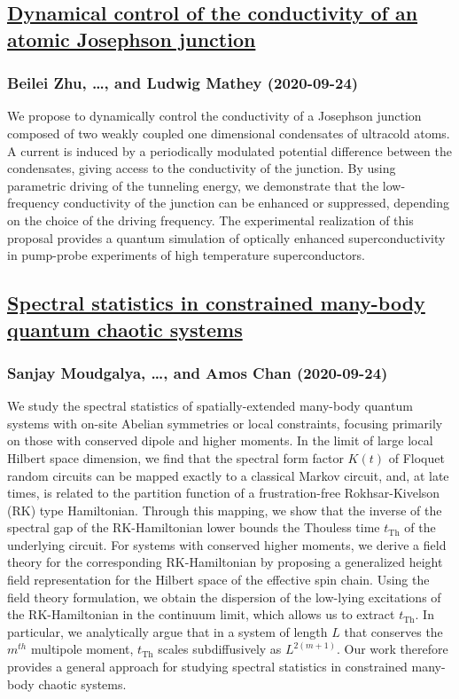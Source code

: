 \subsection*{\href{http://arxiv.org/abs/2009.11864v1}{Dynamical control of the conductivity of an atomic Josephson junction}}
\subsubsection*{Beilei Zhu, \dots, and Ludwig Mathey (2020-09-24)}
We propose to dynamically control the conductivity of a Josephson junction
composed of two weakly coupled one dimensional condensates of ultracold atoms.
A current is induced by a periodically modulated potential difference between
the condensates, giving access to the conductivity of the junction. By using
parametric driving of the tunneling energy, we demonstrate that the
low-frequency conductivity of the junction can be enhanced or suppressed,
depending on the choice of the driving frequency. The experimental realization
of this proposal provides a quantum simulation of optically enhanced
superconductivity in pump-probe experiments of high temperature
superconductors.

\subsection*{\href{http://arxiv.org/abs/2009.11863v1}{Spectral statistics in constrained many-body quantum chaotic systems}}
\subsubsection*{Sanjay Moudgalya, \dots, and Amos Chan (2020-09-24)}
We study the spectral statistics of spatially-extended many-body quantum
systems with on-site Abelian symmetries or local constraints, focusing
primarily on those with conserved dipole and higher moments. In the limit of
large local Hilbert space dimension, we find that the spectral form factor
$K(t)$ of Floquet random circuits can be mapped exactly to a classical Markov
circuit, and, at late times, is related to the partition function of a
frustration-free Rokhsar-Kivelson (RK) type Hamiltonian. Through this mapping,
we show that the inverse of the spectral gap of the RK-Hamiltonian lower bounds
the Thouless time $t_\mathrm{Th}$ of the underlying circuit. For systems with
conserved higher moments, we derive a field theory for the corresponding
RK-Hamiltonian by proposing a generalized height field representation for the
Hilbert space of the effective spin chain. Using the field theory formulation,
we obtain the dispersion of the low-lying excitations of the RK-Hamiltonian in
the continuum limit, which allows us to extract $t_\mathrm{Th}$. In particular,
we analytically argue that in a system of length $L$ that conserves the
$m^{th}$ multipole moment, $t_\mathrm{Th}$ scales subdiffusively as
$L^{2(m+1)}$. Our work therefore provides a general approach for studying
spectral statistics in constrained many-body chaotic systems.

